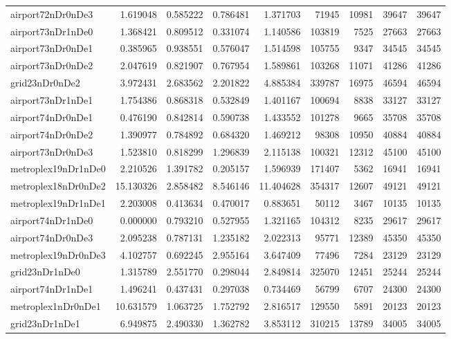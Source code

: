 \begin{longtable}{|l|r|r|r|r|r|r|r|r|}
airport72nDr0nDe3 & 1.619048 & 0.585222 & 0.786481 & 1.371703 & 71945 & 10981 & 39647 & 39647 \\
airport73nDr1nDe0 & 1.368421 & 0.809512 & 0.331074 & 1.140586 & 103819 & 7525 & 27663 & 27663 \\
airport73nDr0nDe1 & 0.385965 & 0.938551 & 0.576047 & 1.514598 & 105755 & 9347 & 34545 & 34545 \\
airport73nDr0nDe2 & 2.047619 & 0.821907 & 0.767954 & 1.589861 & 103268 & 11071 & 41286 & 41286 \\
grid23nDr0nDe2 & 3.972431 & 2.683562 & 2.201822 & 4.885384 & 339787 & 16975 & 46594 & 46594 \\
airport73nDr1nDe1 & 1.754386 & 0.868318 & 0.532849 & 1.401167 & 100694 & 8838 & 33127 & 33127 \\
airport74nDr0nDe1 & 0.476190 & 0.842814 & 0.590738 & 1.433552 & 101278 & 9665 & 35708 & 35708 \\
airport74nDr0nDe2 & 1.390977 & 0.784892 & 0.684320 & 1.469212 & 98308 & 10950 & 40884 & 40884 \\
airport73nDr0nDe3 & 1.523810 & 0.818299 & 1.296839 & 2.115138 & 100321 & 12312 & 45100 & 45100 \\
metroplex19nDr1nDe0 & 2.210526 & 1.391782 & 0.205157 & 1.596939 & 171407 & 5362 & 16941 & 16941 \\
metroplex18nDr0nDe2 & 15.130326 & 2.858482 & 8.546146 & 11.404628 & 354317 & 12607 & 49121 & 49121 \\
metroplex19nDr1nDe1 & 2.203008 & 0.413634 & 0.470017 & 0.883651 & 50112 & 3467 & 10135 & 10135 \\
airport74nDr1nDe0 & 0.000000 & 0.793210 & 0.527955 & 1.321165 & 104312 & 8235 & 29617 & 29617 \\
airport74nDr0nDe3 & 2.095238 & 0.787131 & 1.235182 & 2.022313 & 95771 & 12389 & 45350 & 45350 \\
metroplex19nDr0nDe3 & 4.102757 & 0.692245 & 2.955164 & 3.647409 & 77496 & 7284 & 23129 & 23129 \\
grid23nDr1nDe0 & 1.315789 & 2.551770 & 0.298044 & 2.849814 & 325070 & 12451 & 25244 & 25244 \\
airport74nDr1nDe1 & 1.496241 & 0.437431 & 0.297038 & 0.734469 & 56799 & 6707 & 24300 & 24300 \\
metroplex1nDr0nDe1 & 10.631579 & 1.063725 & 1.752792 & 2.816517 & 129550 & 5891 & 20123 & 20123 \\
grid23nDr1nDe1 & 6.949875 & 2.490330 & 1.362782 & 3.853112 & 310215 & 13789 & 34005 & 34005 \\

\end{longtable}
